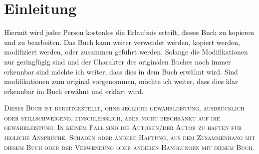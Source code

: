 \chapter{Einleitung}\label{ch:einleitung}

Hiermit wird jeder Person kostenlos die Erlaubnis erteilt, dieses Buch zu kopieren und zu bearbeiten.
Das Buch kann weiter verwendet werden, kopiert werden, modifiziert werden, oder zusammen geführt werden.
Solange die Modifikationen nur geringfügig sind und der Charakter des originalen Buches noch immer erkennbar sind möchte ich weiter, dass dies in dem Buch erwähnt wird.
Sind modifikationen zum original vorgenommen, möchte ich weiter, dass dies klar erkennbar im Buch erwähnt und erklärt wird.

\textsc{Dieses Buch ist bereitgestellt, ohne jegliche gewährleistung, ausdrücklich oder stillschweigend, einschließlich, aber nicht beschränkt auf die gewährleistung.
In keinem Fall sind die Autoren/der Autor zu haften für jegliche Ansprüche, Schäden oder andere Haftung, aus dem Zusammenhang mit diesem Buch oder der Verwendung oder anderen Handlungen mit diesem Buch.}